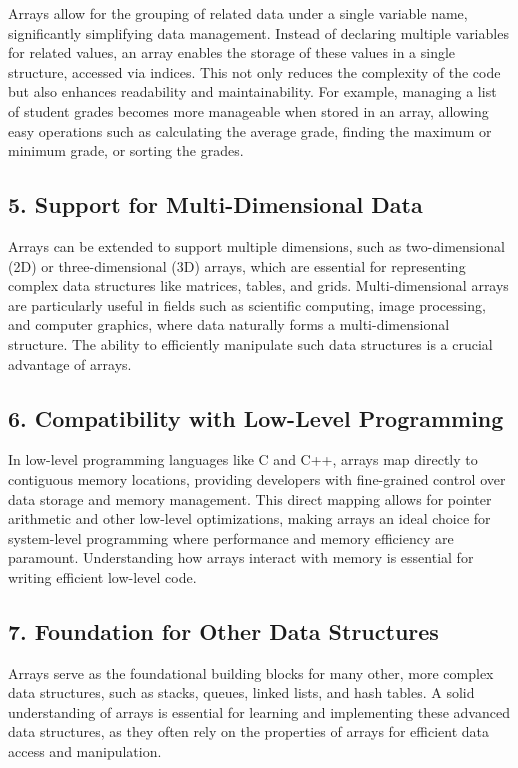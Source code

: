 \documentclass{book}
\begin{document}
Arrays allow for the grouping of related data under a single variable name, significantly simplifying data management. Instead of declaring multiple variables for related values, an array enables the storage of these values in a single structure, accessed via indices. This not only reduces the complexity of the code but also enhances readability and maintainability. For example, managing a list of student grades becomes more manageable when stored in an array, allowing easy operations such as calculating the average grade, finding the maximum or minimum grade, or sorting the grades.

\subsection{5. Support for Multi-Dimensional Data}

Arrays can be extended to support multiple dimensions, such as two-dimensional (2D) or three-dimensional (3D) arrays, which are essential for representing complex data structures like matrices, tables, and grids. Multi-dimensional arrays are particularly useful in fields such as scientific computing, image processing, and computer graphics, where data naturally forms a multi-dimensional structure. The ability to efficiently manipulate such data structures is a crucial advantage of arrays.

\subsection{6. Compatibility with Low-Level Programming}

In low-level programming languages like C and C++, arrays map directly to contiguous memory locations, providing developers with fine-grained control over data storage and memory management. This direct mapping allows for pointer arithmetic and other low-level optimizations, making arrays an ideal choice for system-level programming where performance and memory efficiency are paramount. Understanding how arrays interact with memory is essential for writing efficient low-level code.

\subsection{7. Foundation for Other Data Structures}

Arrays serve as the foundational building blocks for many other, more complex data structures, such as stacks, queues, linked lists, and hash tables. A solid understanding of arrays is essential for learning and implementing these advanced data structures, as they often rely on the properties of arrays for efficient data access and manipulation.
\end{document}
